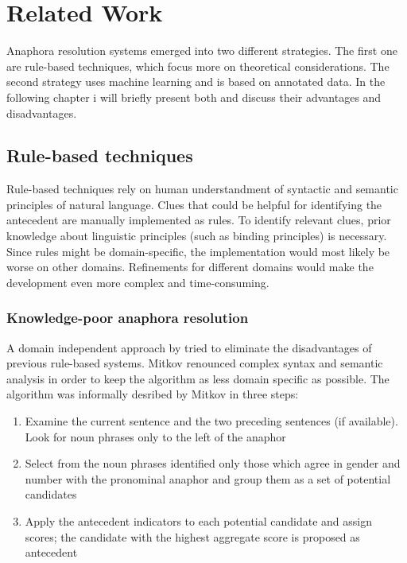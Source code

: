 \chapter{Related Work}
\label{sec:Related Work}

Anaphora resolution systems emerged into two different strategies. The first one are rule-based techniques, which focus more on theoretical considerations. The second strategy uses machine learning and is based on annotated data. In the following chapter i will briefly present both and discuss their advantages and disadvantages.

\section{Rule-based techniques}

Rule-based techniques rely on human understandment of syntactic and semantic principles of natural language. Clues that could be helpful for identifying the antecedent are manually implemented as rules. To identify relevant clues, prior knowledge about linguistic principles (such as binding principles) is necessary. Since rules might be domain-specific, the implementation would most likely be worse on other domains. Refinements for different domains would make the development even more complex and time-consuming.

\subsection{Knowledge-poor anaphora resolution}

A domain independent approach by \citep{mitkov1998robust}  tried to eliminate the disadvantages of previous rule-based systems. Mitkov renounced complex syntax and semantic analysis in order to keep the algorithm as less domain specific as possible. The algorithm was informally desribed by Mitkov in three steps:
\begin{enumerate} 
\item Examine the current sentence and the two preceding sentences (if available). Look for noun phrases only to the left of the anaphor
\item Select from the noun phrases identified only those which agree in gender and number with the pronominal anaphor and group them as a set of potential candidates
\item Apply the antecedent indicators to each potential candidate and assign scores; the candidate with the highest aggregate score is proposed as antecedent
\end{enumerate}


